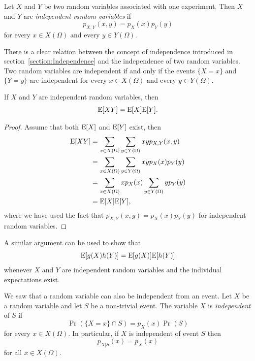 Let $X$ and $Y$ be two random variables associated with one experiment.
Then $X$ and $Y$ are \emph{independent random variables} if
\begin{equation*}
p_{X,Y} (x,y) = p_X (x) p_Y (y)
\end{equation*}
for every $x \in X(\Omega)$ and every $y \in Y(\Omega)$.

There is a clear relation between the concept of independence introduced in section~\ref{section:Independence} and the independence of two random variables.
Two random variables are independent if and only if the events $\{ X = x \}$ and $\{ Y = y \}$ are independent for every $x \in X(\Omega)$ and every $y \in Y(\Omega)$.

\begin{theorem}
If $X$ and $Y$ are independent random variables, then
\begin{equation*}
\mathrm{E} [X Y] = \mathrm{E} [X] \mathrm{E} [Y] .
\end{equation*}
\end{theorem}
\begin{proof}
Assume that both $\mathrm{E} [X]$ and $\mathrm{E}[Y]$ exist, then
\begin{equation*}
\begin{split}
\mathrm{E} [XY]
&= \sum_{x \in X(\Omega)} \sum_{y \in Y(\Omega)} x y p_{X,Y} (x,y) \\
&= \sum_{x \in X(\Omega)} \sum_{y \in Y(\Omega)} x y p_X (x) p_Y (y) \\
&= \sum_{x \in X(\Omega)} x p_X (x) \sum_{y \in Y(\Omega)} y p_Y (y) \\
&= \mathrm{E} [X] \mathrm{E} [Y] ,
\end{split}
\end{equation*}
where we have used the fact that $p_{X,Y} (x,y) = p_X (x) p_Y (y)$ for independent random variables.
\end{proof}


A similar argument can be used to show that
\begin{equation*}
\mathrm{E}[ g(X) h(Y) ] = \mathrm{E} [ g(X) ] \mathrm{E} [ h(Y) ]
\end{equation*}
whenever $X$ and $Y$ are independent random variables and the individual expectations exist.

We saw that a random variable can also be independent from an event.
Let $X$ be a random variable and let $S$ be a non-trivial event.
The variable $X$ is \emph{independent} of $S$ if
\begin{equation*}
\Pr (\{X = x \} \cap S ) = p_X (x) \Pr (S)
\end{equation*}
for every $x \in X(\Omega)$.
In particular, if $X$ is independent of event $S$ then
\begin{equation*}
p_{X|S} (x) = p_X (x)
\end{equation*}
for all $x \in X(\Omega)$.

